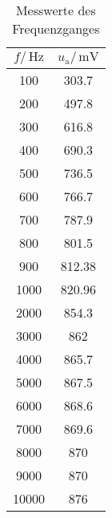 \begin{table}[H]
\begin{center}
\begin{tabular}{@{}cc@{}}
\toprule
$f / \, \si{\hertz}$ & $u_\mathrm{a} / \, \si{\milli\volt}$ \\ \midrule
  \midrule
100                  & 303.7                       \\
200                  & 497.8                       \\
300                  & 616.8                       \\
400                  & 690.3                       \\
500                  & 736.5                       \\
600                  & 766.7                       \\
700                  & 787.9                       \\
800                  & 801.5                       \\
900                  & 812.38                      \\
1000                 & 820.96                      \\
2000                 & 854.3                       \\
3000                 & 862                         \\
4000                 & 865.7                       \\
5000                 & 867.5                       \\
6000                 & 868.6                       \\
7000                 & 869.6                       \\
8000                 & 870                         \\
9000                 & 870                         \\
10000                & 876                         \\ \bottomrule
\end{tabular}
\end{center}
\caption{Messwerte des Frequenzganges}
\end{table}